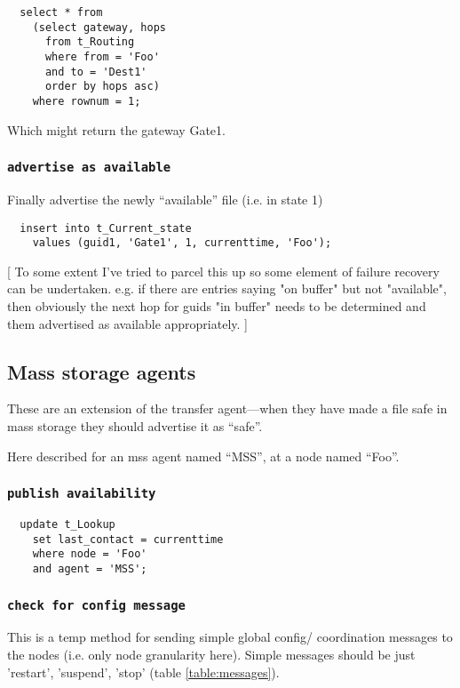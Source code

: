 \documentclass{cmspaper}
\begin{document}
{\small\begin{verbatim}
  select * from
    (select gateway, hops
      from t_Routing
      where from = 'Foo'
      and to = 'Dest1'
      order by hops asc)
    where rownum = 1;
\end{verbatim}}

Which might return the gateway Gate1. 

\subsubsection{\textbf{\texttt{advertise as available}}}
Finally advertise the newly ``available'' file (i.e. in state 1)

{\small\begin{verbatim}
  insert into t_Current_state
    values (guid1, 'Gate1', 1, currenttime, 'Foo');
\end{verbatim}}

[ To some extent I've tried to parcel this up so some element of failure recovery can be undertaken. e.g. if there are entries saying "on buffer" but not "available", then obviously the next hop for guids "in buffer" needs to be determined and them advertised as available appropriately. ]

\subsection{Mass storage agents}
These are an extension of the transfer agent---when they have made a
file safe in mass storage they should advertise it as ``safe''.

Here described for an mss agent named ``MSS'', at a node named ``Foo''.

\subsubsection{\textbf{\texttt{publish availability}}}

{\small\begin{verbatim}
  update t_Lookup
    set last_contact = currenttime
    where node = 'Foo'
    and agent = 'MSS';
\end{verbatim}}

\subsubsection{\textbf{\texttt{check for config message}}}
This is a temp method for sending simple global config/ coordination messages to the nodes (i.e. only node granularity here). Simple messages should be just 'restart', 'suspend', 'stop' (table \ref{table:messages}).
\end{document}
